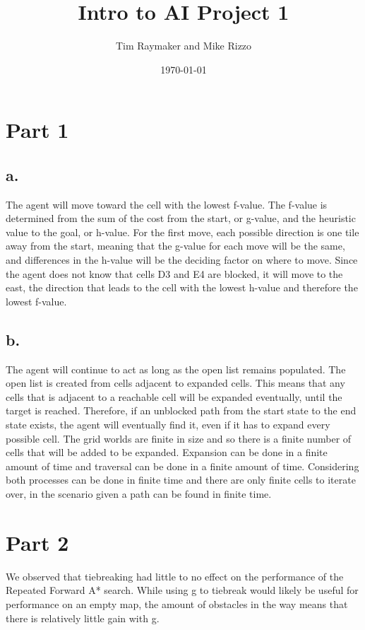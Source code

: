 \documentclass[a4paper,12pt]{article}
\begin{document}
\title{Intro to AI Project 1}
\author{Tim Raymaker and Mike Rizzo}
\date{\today}
\maketitle
\section{Part 1}
\subsection{a.}
The agent will move toward the cell with the lowest f-value. The f-value is determined from the sum of the cost from the start, or g-value,  and the heuristic value to the goal, or h-value. For the first move, each possible direction is one tile away from the start, meaning that the g-value for each move will be the same, and differences in the h-value will be the deciding factor on where to move. Since the agent does not know that cells D3 and E4 are blocked, it will move to the east, the direction that leads to the cell with the lowest h-value and therefore the lowest f-value. 
\subsection{b.}
The agent will continue to act as long as the open list remains populated. The open list is created from cells adjacent to expanded cells. This means that any cells that is adjacent to a reachable cell will be expanded eventually, until the target is reached. Therefore, if an unblocked path from the start state to the end state exists, the agent will eventually find it, even if it has to expand every possible cell. The grid worlds are finite in size and so there is a finite number of cells that will be added to be expanded. Expansion can be done in a finite amount of time and traversal can be done in a finite amount of time. Considering both processes can be done in finite time and there are only finite cells to iterate over, in the scenario given a path can be found in finite time. 
\section{Part 2}
We observed that tiebreaking had little to no effect on the performance of the Repeated Forward A* search. While using g to tiebreak would likely be useful for performance on an empty map, the amount of obstacles in the way means that there is relatively little gain with g. 
\end{document}
